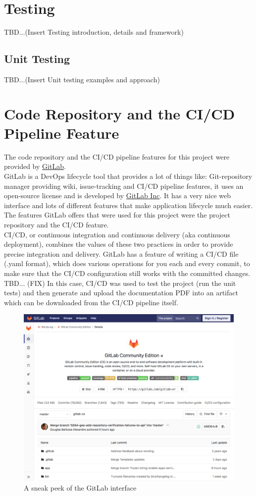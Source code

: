 \section{Testing}
TBD...(Insert Testing introduction, details and framework)
\subsection{Unit Testing}
TBD...(Insert Unit testing examples and approach)
\newpage
\section{Code Repository and the CI/CD Pipeline Feature}
\label{sec:GitLab}
The code repository and the CI/CD pipeline features for this project were provided by \href{https://gitlab.com/}{GitLab}.\\
GitLab is a DevOps lifecycle tool that provides a lot of things like: Git-repository manager providing wiki, issue-tracking and CI/CD pipeline features, it uses an open-source license and is developed by \href{https://about.gitlab.com/company/}{GitLab Inc}.
It has a very nice web interface and lots of different features that make application lifecycle much easier. The features GitLab offers that were used for this project were the project repository and the CI/CD feature.\\
\newline
CI/CD, or continuous integration and continuous delivery (aka continuous deployment), combines the values of these two practices in order to provide precise integration and delivery.
GitLab has a feature of writing a CI/CD file (.yaml format), which does various operations for you each and every commit, to make sure that the CI/CD configuration still works with the committed changes.\\
TBD... (FIX) In this case, CI/CD was used to test the project (run the unit tests) and then generate and upload the documentation PDF into an artifact which can be downloaded from the CI/CD pipeline itself.
\begin{figure}[H]
	\includegraphics[width=\linewidth]{./Images/Implementation/gitlab_view.png}
	\caption{A sneak peek of the GitLab interface}
\end{figure}	
	
